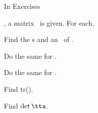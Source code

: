 {\noin In Exercises }
{, a matrix \tta\ is given. For each, 
\begin{list}{()}{}
\item Find the \el s and an \ev\ of \tta.
\item	Do the same for \ttat.
\item	Do the same for \ttai.
\item	Find tr(\tta).
\item	Find $\det{\tta}$.
\end{list}}
